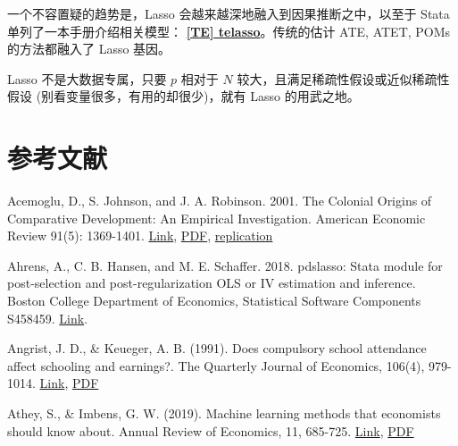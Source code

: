 {一个不容置疑的趋势是，Lasso 会越来越深地融入到因果推断之中，以至于 Stata 单列了一本手册介绍相关模型： \href{https://www.stata.com/manuals/tetelasso.pdf}{\bfseries{[\MakeUppercase{te}] telasso}}。传统的估计 ATE, ATET, POMs 的方法都融入了 Lasso 基因。

Lasso 不是大数据专属，只要 $p$ 相对于 $N$ 较大，且满足稀疏性假设或近似稀疏性假设 (别看变量很多，有用的却很少)，就有  Lasso  的用武之地。




%
%




\section{参考文献}
\small

Acemoglu, D., S. Johnson, and J. A. Robinson. 2001. The Colonial Origins of Comparative Development: An Empirical Investigation. American Economic Review 91(5): 1369-1401. \href{https://www.aeaweb.org/articles?id=10.1257/aer.91.5.1369}{Link},  \href{http://sci-hub.ren/10.1257/aer.91.5.1369}{PDF}, \href{http://economics.mit.edu/faculty/acemoglu/data/ajr2001}{replication}

Ahrens, A., C. B. Hansen, and M. E. Schaffer. 2018. pdslasso: Stata module for post-selection and post-regularization
OLS or IV estimation and inference. Boston College Department of Economics, Statistical Software Components
S458459. \href{https://ideas.repec.org/c/boc/bocode/s458459.html}{Link}.

Angrist, J. D., \& Keueger, A. B. (1991). Does compulsory school attendance affect schooling and earnings?. The Quarterly Journal of Economics, 106(4), 979-1014. \href{https://doi.org/10.2307/2937954}{Link}, \href{http://sci-hub.ren/10.2307/2937954}{PDF}

Athey, S., \& Imbens, G. W. (2019). Machine learning methods that economists should know about. Annual Review of Economics, 11, 685-725. \href{https://doi.org/10.1146/annurev-economics-080217-053433}{Link}, \href{http://sci-hub.ren/10.1146/annurev-economics-080217-053433}{PDF}

}
